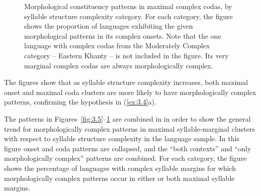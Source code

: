 \begin{figure}
\caption{\label{fig:3.6} Morphological constituency patterns in maximal complex codas, by syllable structure complexity category. For each category, the figure shows the proportion of languages exhibiting the given morphological patterns in its complex onsets. Note that the one language with complex codas from the Moderately Complex category -- Eastern Khanty -- is not included in the figure. Its very marginal complex codas are always morphologically complex.}
\end{figure}


  The figures show that as syllable structure complexity increases, both maximal onset and maximal coda clusters are more likely to have morphologically complex patterns, confirming the hypothesis in (\ref{ex:3.4}a).

  The patterns in Figures~\ref{fig:3.5}--\ref{fig:3.6} are combined in  in order to show the general trend for morphologically complex patterns in maximal syllable-marginal clusters with respect to syllable structure complexity in the language sample. In this figure onset and coda patterns are collapsed, and the “both contexts” and “only morphologically complex” patterns are combined. For each category, the figure shows the percentage of languages with complex syllable margins for which morphologically complex patterns occur in either or both maximal syllable margins.


